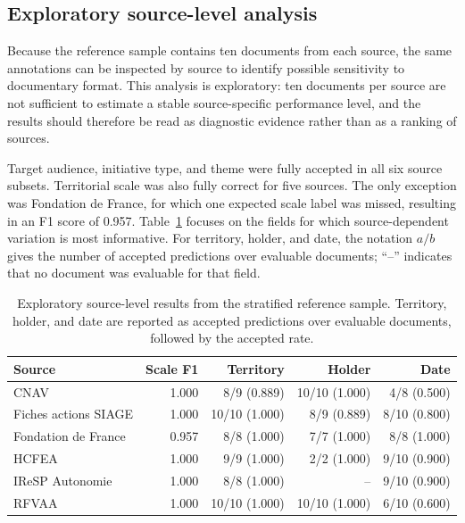
\subsection{Exploratory source-level analysis}

Because the reference sample contains ten documents from each source, the same
annotations can be inspected by source to identify possible sensitivity to
documentary format. This analysis is exploratory: ten documents per source are
not sufficient to estimate a stable source-specific performance level, and the
results should therefore be read as diagnostic evidence rather than as a ranking
of sources.

Target audience, initiative type, and theme were fully accepted in all six
source subsets. Territorial scale was also fully correct for five sources. The
only exception was Fondation de France, for which one expected scale label was
missed, resulting in an F1 score of 0.957. Table~\ref{tab:llm-source-results}
focuses on the fields for which source-dependent variation is most informative.
For territory, holder, and date, the notation $a/b$ gives the number of accepted
predictions over evaluable documents; ``--'' indicates that no document was
evaluable for that field.

\begin{table}[H]
\centering
\small
\begin{tabular}{lrrrr}
\toprule
Source & Scale F1 & Territory & Holder & Date \\
\midrule
CNAV & 1.000 & 8/9 (0.889) & 10/10 (1.000) & 4/8 (0.500) \\
Fiches actions SIAGE & 1.000 & 10/10 (1.000) & 8/9 (0.889) & 8/10 (0.800) \\
Fondation de France & 0.957 & 8/8 (1.000) & 7/7 (1.000) & 8/8 (1.000) \\
HCFEA & 1.000 & 9/9 (1.000) & 2/2 (1.000) & 9/10 (0.900) \\
IReSP Autonomie & 1.000 & 8/8 (1.000) & -- & 9/10 (0.900) \\
RFVAA & 1.000 & 10/10 (1.000) & 10/10 (1.000) & 6/10 (0.600) \\
\bottomrule
\end{tabular}
\caption{Exploratory source-level results from the stratified reference sample.
Territory, holder, and date are reported as accepted predictions over evaluable
documents, followed by the accepted rate.}
\label{tab:llm-source-results}
\end{table}

